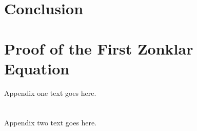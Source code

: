 \documentclass[a4paper, 10pt, american, titlepage]{article}
\begin{document}
\section{Conclusion}
\label{sec:conclusion}

\clearpage %

\printbibliography
{}

\newpage

\appendices
\section{Proof of the First Zonklar Equation}
Appendix one text goes here.

\section{}
Appendix two text goes here.
\end{document}
